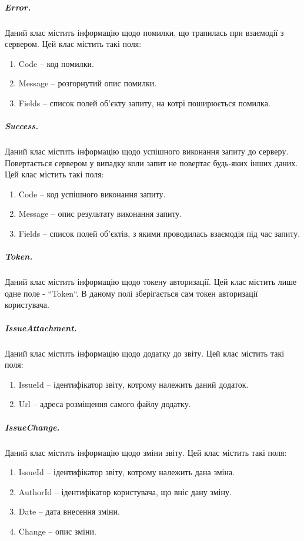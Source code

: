 \documentclass[../main.tex]{subfiles}
\begin{document}
		\subparagraph{Error.}
			Даний клас містить інформацію щодо помилки, що трапилась при взаємодії з сервером. Цей клас містить такі поля:
			\begin{enumerate}
				\item Code -- код помилки.
				\item Message -- розгорнутий опис помилки.
				\item Fields -- список полей об'єкту запиту, на котрі поширюється помилка.
			\end{enumerate}
		
		\subparagraph{Success.}
			Даний клас містить інформацію щодо успішного виконання запиту до серверу. Повертається сервером у випадку коли запит не повертає будь-яких інших даних. Цей клас містить такі поля:
			\begin{enumerate}
				\item Code -- код успішного виконання запиту.
				\item Message -- опис результату виконання запиту.
				\item Fields -- список полей об'єктів, з якими проводилась взаємодія під час запиту.
			\end{enumerate}

		\subparagraph{Token.}
			Даний клас містить інформацію щодо токену авторизації. Цей клас містить лише одне поле - ``Token``. В даному полі зберігається сам токен авторизації користувача.

		\subparagraph{IssueAttachment.}
			Даний клас містить інформацію щодо додатку до звіту. Цей клас містить такі поля:
			\begin{enumerate}
				\item IssueId -- ідентифікатор звіту, котрому належить даний додаток.
				\item Url -- адреса розміщення самого файлу додатку.
			\end{enumerate}
		
		\subparagraph{IssueChange.}
			Даний клас містить інформацію щодо зміни звіту. Цей клас містить такі поля:
			\begin{enumerate}
				\item IssueId -- ідентифікатор звіту, котрому належить дана зміна.
				\item AuthorId -- ідентифікатор користувача, що вніс дану зміну.
				\item Date -- дата внесення зміни.
				\item Change -- опис зміни.
			\end{enumerate}
		
\end{document}
